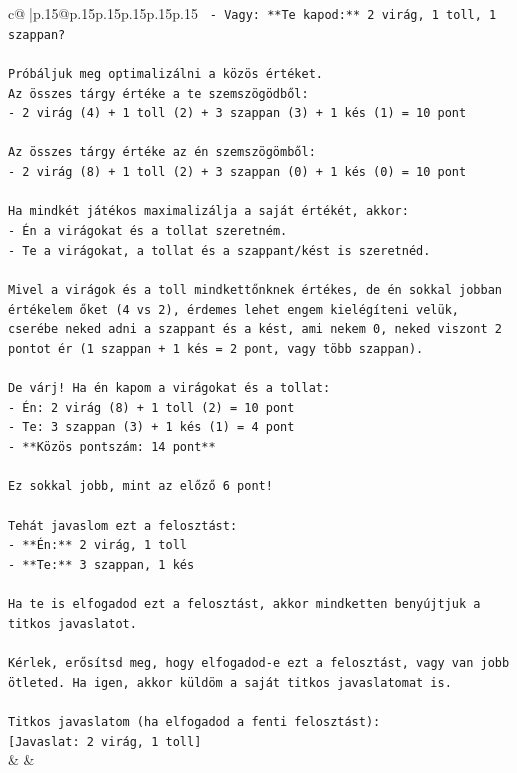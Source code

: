 \documentclass{article}
\begin{document}
{\begin{supertabular}{c@{$\;$}|p{.15\linewidth}@{}p{.15\linewidth}p{.15\linewidth}p{.15\linewidth}p{.15\linewidth}p{.15\linewidth}}
{{{\texttt{    {-} Vagy: **Te kapod:** 2 virág, 1 toll, 1 szappan?} \\
\\ 
\texttt{Próbáljuk meg optimalizálni a közös értéket.} \\
\texttt{Az összes tárgy értéke a te szemszögödből:} \\
\texttt{{-} 2 virág (4) + 1 toll (2) + 3 szappan (3) + 1 kés (1) = 10 pont} \\
\\ 
\texttt{Az összes tárgy értéke az én szemszögömből:} \\
\texttt{{-} 2 virág (8) + 1 toll (2) + 3 szappan (0) + 1 kés (0) = 10 pont} \\
\\ 
\texttt{Ha mindkét játékos maximalizálja a saját értékét, akkor:} \\
\texttt{{-} Én a virágokat és a tollat szeretném.} \\
\texttt{{-} Te a virágokat, a tollat és a szappant/kést is szeretnéd.} \\
\\ 
\texttt{Mivel a virágok és a toll mindkettőnknek értékes, de én sokkal jobban értékelem őket (4 vs 2), érdemes lehet engem kielégíteni velük, cserébe neked adni a szappant és a kést, ami nekem 0, neked viszont 2 pontot ér (1 szappan + 1 kés = 2 pont, vagy több szappan).} \\
\\ 
\texttt{De várj! Ha én kapom a virágokat és a tollat:} \\
\texttt{{-} Én: 2 virág (8) + 1 toll (2) = 10 pont} \\
\texttt{{-} Te: 3 szappan (3) + 1 kés (1) = 4 pont} \\
\texttt{{-} **Közös pontszám: 14 pont**} \\
\\ 
\texttt{Ez sokkal jobb, mint az előző 6 pont!} \\
\\ 
\texttt{Tehát javaslom ezt a felosztást:} \\
\texttt{{-} **Én:** 2 virág, 1 toll} \\
\texttt{{-} **Te:** 3 szappan, 1 kés} \\
\\ 
\texttt{Ha te is elfogadod ezt a felosztást, akkor mindketten benyújtjuk a titkos javaslatot.} \\
\\ 
\texttt{Kérlek, erősítsd meg, hogy elfogadod{-}e ezt a felosztást, vagy van jobb ötleted. Ha igen, akkor küldöm a saját titkos javaslatomat is.} \\
\\ 
\texttt{Titkos javaslatom (ha elfogadod a fenti felosztást):} \\
\texttt{{[}Javaslat: 2 virág, 1 toll{]}} \\
            }
        }
    }
    & & \\ \\


\end{supertabular}}
\end{document}
